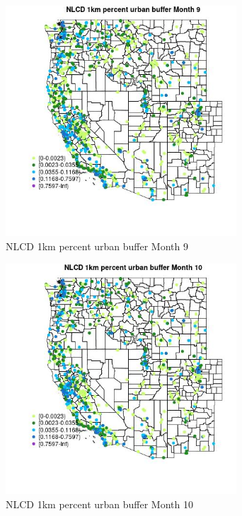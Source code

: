 \begin{figure} 
\centering  
\includegraphics[width=0.77\textwidth]{Code_Outputs/Report_ML_input_PM25_Step4_part_f_de_duplicated_aves_prioritize_24hr_obswNAs_MapObsMo9NLCD_1km_percent_urban_buffer.jpg} 
\caption{\label{fig:Report_ML_input_PM25_Step4_part_f_de_duplicated_aves_prioritize_24hr_obswNAsMapObsMo9NLCD_1km_percent_urban_buffer}NLCD 1km percent urban buffer Month 9} 
\end{figure} 
 

\begin{figure} 
\centering  
\includegraphics[width=0.77\textwidth]{Code_Outputs/Report_ML_input_PM25_Step4_part_f_de_duplicated_aves_prioritize_24hr_obswNAs_MapObsMo10NLCD_1km_percent_urban_buffer.jpg} 
\caption{\label{fig:Report_ML_input_PM25_Step4_part_f_de_duplicated_aves_prioritize_24hr_obswNAsMapObsMo10NLCD_1km_percent_urban_buffer}NLCD 1km percent urban buffer Month 10} 
\end{figure} 
 

